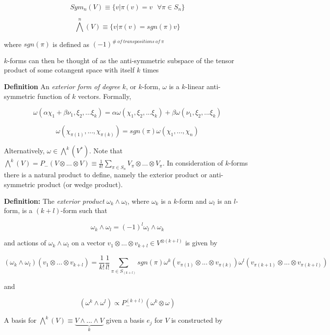 \documentclass{article}\usepackage[]{graphicx}\usepackage[]{color}
\begin{document}
$$
Sym_n (V) \equiv \lbrace v \vert \pi (v)=v \ \ \ \forall \pi \in S_n\rbrace
$$

$$
\bigwedge^n(V)\equiv \lbrace v\vert \pi (v)= sgn(\pi ) v\rbrace
$$
 
 \begin{center}
 where $sgn(\pi)$ is defined as $(-1)^{\# \ of \ transpositions \ of \ \pi}$  
\end{center}  
 
$k$-forms can then be thought of as the anti-symmetric subspace of the tensor product of some cotangent space with itself $k$ times
 
 
 \textbf{Definition} An \textit{exterior form of degree} $k$, or $k$-form, $\omega$  is a $k$-linear anti-symmetric function of $k$ vectors. Formally,
 
 $$
 \omega (\alpha \chi_1 + \beta \nu_1,\xi_2,...\xi_k )=\alpha \omega (\chi_1,\xi_2,...\xi_k )+\beta \omega (\nu_1,\xi_2,...\xi_k )
 $$
 
\begin{center}

\end{center} 
 
$$
\omega(\chi_{\pi(1)},...,\chi_{\pi(k)})=sgn(\pi) \omega(\chi_1,...,\chi_n)
$$ 
 
Alternatively, $\omega\in\bigwedge^k(V^*)$. Note that $\bigwedge^k(V)=P_-(V\otimes...\otimes V)\equiv \frac{1}{k!}\sum_{\pi\in S_n}V_{\pi}\otimes ... \otimes V_{\pi}$. In consideration of $k$-forms there is a natural product to define, namely the exterior product or anti-symmetric product 
 (or wedge product).
 
\textbf{Definition:} The \textit{exterior product} $\omega_k\wedge \omega_l$, where $\omega_k$ is a $k$-form and $\omega_l$ is an $l$-form, is a $(k+l)$-form such that 

$$
\omega_k\wedge\omega_l=(-1)^l \omega_l\wedge\omega_k
$$
 
and actions of $\omega_k\wedge \omega_l$ on a vector $v_1\otimes ... \otimes v_{k+l}\in V^{\otimes(k+l)}$ is given by 

$$
(\omega_k\wedge \omega_l)(v_1\otimes ... \otimes v_{k+l})=\frac{1}{k!}\frac{1}{l!}\sum_
{\pi\in S_{(k+l)}}sgn(\pi )\omega^k(v_{\pi(1)}\otimes ... \otimes v_{\pi(k)})\omega^l(v_{\pi(k+1)}\otimes ... \otimes v_{\pi(k+l)})
$$  
 
and 

$$ 
 (\omega^k\wedge\omega^l)\propto P^{(k+l)}_{-}(\omega^k\otimes\omega )
$$
 
A basis for $\bigwedge^{k}(V)\equiv \underbrace{ V\wedge ...\wedge V}_k$ given a basis $e
 _j$ for $V$ is constructed by
\end{document}
